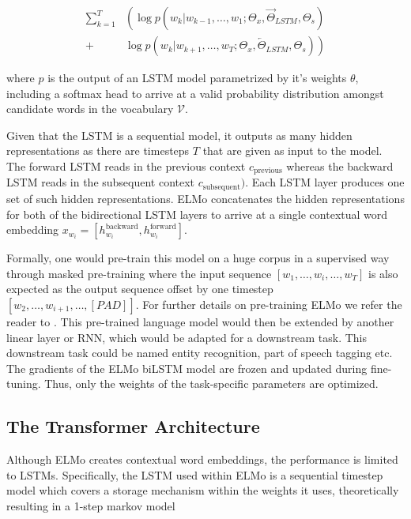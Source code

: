 \documentclass[a4paper,12pt,oneside,openright]{report}
\begin{document}
\begin{align} 
\sum_{k=1}^{T} &\left(\log p\left(w_{k} | w_{k-1}, \ldots, w_{1} ; \Theta_{x}, \vec{\Theta}_{L S T M}, \Theta_{s}\right)\right.\\
+&\left.\log p\left(w_{k} | w_{k+1}, \ldots, w_{T}; \Theta_{x}, \overleftarrow{\Theta}_{L S T M}, \Theta_{s}\right)\right) 
\end{align}

where $p$ is the output of an LSTM model parametrized by it's weights $\theta$, including a softmax head to arrive at a valid probability distribution amongst candidate words in the vocabulary $\mathcal{V}$.

Given that the LSTM is a sequential model, it outputs as many hidden representations as there are timesteps $T$ that are given as input to the model. 
The forward LSTM reads in the previous context $c_\text{previous}$ whereas the backward LSTM reads in the subsequent context $c_\text{subsequent})$.
Each LSTM layer produces one set of such hidden representations.
ELMo concatenates the hidden representations for both of the bidirectional LSTM layers to arrive at a single contextual word embedding $x_{w_i} = [h^\text{backward}_{w_i}, h^\text{forward}_{w_i}]$.

Formally, one would pre-train this model on a huge corpus in a supervised way through masked pre-training where the input sequence $[w_1, \ldots , w_i, \ldots, w_T]$ is also expected as the output sequence offset by one timestep $[w_2, \ldots, w_{i+1}, \ldots , [PAD] ]$.
For further details on pre-training ELMo we refer the reader to \cite{jozefowicz16}.
This pre-trained language model would then be extended by another linear layer or RNN, which would be adapted for a downstream task.
This downstream task could be named entity recognition, part of speech tagging etc.
The gradients of the ELMo biLSTM model are frozen and updated during fine-tuning.
Thus, only the weights of the task-specific parameters are optimized. 

\subsection{The Transformer Architecture}

Although ELMo creates contextual word embeddings, the performance is limited to LSTMs.
Specifically, the LSTM used within ELMo is a sequential timestep model which covers a storage mechanism within the weights it uses, theoretically resulting in a 1-step markov model
\end{document}
